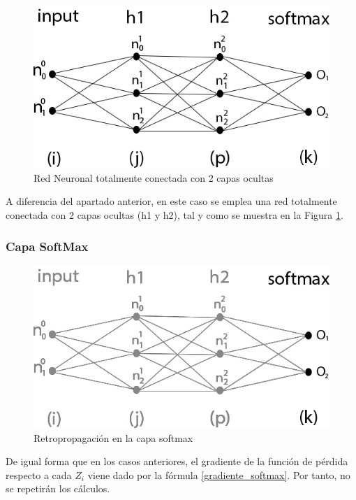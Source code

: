 \begin{figure}[H]
	\centering
	\includegraphics[scale=0.35]{imagenes/nn_2_capas.jpg}  
	\caption{Red Neuronal totalmente conectada con 2 capas ocultas}
	\label{fig:nn_2_capas}
\end{figure}

A diferencia del apartado anterior, en este caso se emplea una red totalmente conectada con 2 capas ocultas (h1 y h2), tal y como se muestra en la Figura \ref{fig:nn_2_capas}. \\

\subsubsection{Capa SoftMax}

\begin{figure}[H]
	\centering
	\includegraphics[scale=0.35]{imagenes/nn_2_capa_output.jpg}  
	\caption{Retropropagación en la capa softmax}
\end{figure}

De igual forma que en los casos anteriores, el gradiente de la función de pérdida respecto a cada $Z_i$ viene dado por la fórmula \ref{gradiente_softmax}. Por tanto, no se repetirán los cálculos. \\

